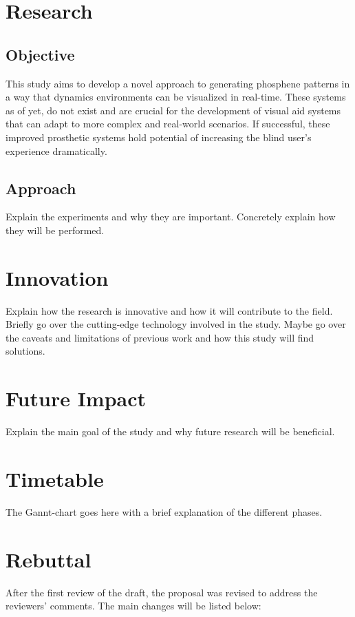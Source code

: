 \documentclass[10pt]{article}
\begin{document}

\pagestyle{rest} %

\section*{Research}\label{sec:research}
\subsection*{Objective}\label{subsec:objective}
This study aims to develop a novel approach to generating phosphene patterns
in a way that dynamics environments can be visualized in real-time. These
systems as of yet, do not exist and are crucial for the development of visual
aid systems that can adapt to more complex and real-world scenarios. If
successful, these improved prosthetic systems hold potential of increasing
the blind user's experience dramatically.

\subsection*{Approach}\label{subsec:approach}
Explain the experiments and why they are important. Concretely explain how they
will be performed.


\section*{Innovation}\label{sec:innovation}
Explain how the research is innovative and how it will contribute to the field.
Briefly go over the cutting-edge technology involved in the study. Maybe go
over the caveats and limitations of previous work and how this study will find
solutions.

\section*{Future Impact}\label{sec:impact}
Explain the main goal of the study and why future research will be beneficial.

\section*{Timetable}\label{sec:timetable}
The Gannt-chart goes here with a brief explanation of the different phases.

\printbibliography%

\section*{Rebuttal}\label{sec:rebuttal}
After the first review of the draft, the proposal was revised to address the
reviewers' comments. The main changes will be listed below:
\end{document}
